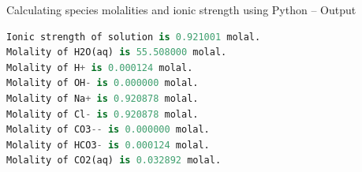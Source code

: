 %
%
\begin{frame}[fragile]{Calculating species molalities and ionic strength using Python -- Output}

\begin{lstlisting}[language=Python, caption=Calculating species molalities and ionic strength using Python -- Output]
Ionic strength of solution is 0.921001 molal.
Molality of H2O(aq) is 55.508000 molal.
Molality of H+ is 0.000124 molal.
Molality of OH- is 0.000000 molal.
Molality of Na+ is 0.920878 molal.
Molality of Cl- is 0.920878 molal.
Molality of CO3-- is 0.000000 molal.
Molality of HCO3- is 0.000124 molal.
Molality of CO2(aq) is 0.032892 molal.
\end{lstlisting}
\end{frame}
%
